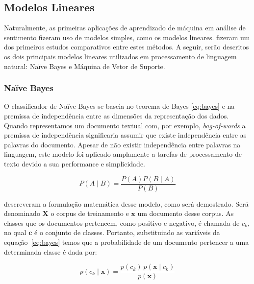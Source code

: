 
\subsection{Modelos Lineares}

Naturalmente, as primeiras aplicações de aprendizado de máquina em análise de
sentimento fizeram uso de modelos simples, como os modelos lineares.
\citet{pang02} fizeram um dos primeiros estudos comparativos entre estes
métodos.
A seguir, serão descritos os dois principais modelos lineares utilizados em
processamento de linguagem natural: Naïve Bayes e Máquina de Vetor de Suporte.

\subsubsection{Naïve Bayes}

O classificador de Naïve Bayes se baseia no teorema de Bayes \ref{eq:bayes} e
na premissa de independência entre as dimensões da representação dos dados.
Quando representamos um documento textual com, por exemplo, \textit{bag-of-words}
a premissa de independência significaria assumir que existe independência entre
as palavras do documento.
Apesar de não existir independência entre palavras na linguagem, este modelo foi
aplicado amplamente a tarefas de processamento de texto devido a sua performance
e simplicidade.

\begin{equation} \label{eq:bayes}
    P(A\mid B) = \frac{P(A) P(B \mid A)}{P(B)}
\end{equation}

\citet{schutze08} descreveram a formulação matemática desse modelo, como será
demostrado.
Será denominado $\mathbf{X}$ o corpus de treinamento e $\mathbf{x}$ um documento
desse corpus.
As classes que os documentos pertencem, como positivo e negativo, é chamada de
$c_k$, no qual $\mathbf{c}$ é o conjunto de classes.
Portanto, substituindo as variáveis da equação~\ref{eq:bayes} temos que a
probabilidade de um documento pertencer a uma determinada classe é dada por:

\begin{equation}
    p(c_k \mid \mathbf{x}) = \frac{p(c_k) \ p(\mathbf{x} \mid c_k)}{p(\mathbf{x})}
\end{equation}

